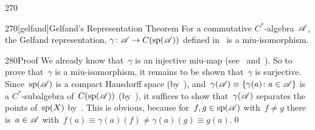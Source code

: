 \begin{parsec}{270}
\begin{point}{270}[gelfand]{Gelfand's Representation Theorem}
For a commutative $C^*$-algebra~$\mathscr{A}$,
the Gelfand representation, 
 $\gamma\colon \mathscr{A}\to C(\mathrm{sp}(\mathscr{A}))$
defined in~
is a miu-isomorphism.
\begin{point}{280}{Proof}%
We already know that~$\gamma$ is an injective miu-map
(see~ 
and~).
So to prove that~$\gamma$ is a miu-isomorphism,
it remains to be shown that~$\gamma$ is surjective.
Since~$\mathrm{sp}(\mathscr{A})$ is a compact Hausdorff space 
(by~),
and~$\gamma(\mathscr{A})\equiv \{\gamma(a)\colon a\in \mathscr{A}\}$
is a $C^*$-subalgebra of~$C(\mathrm{sp}(\mathscr{A}))$
(by~),
it suffices to show that~$\gamma(\mathscr{A})$
separates the points of~$\mathrm{sp}(X)$
by~.
This is obvious,
because
for~$f,g\in \mathrm{sp}(\mathscr{A})$ with~$f\neq g$
there is~$a\in \mathscr{A}$ with~$f(a)\equiv \gamma(a)(f)
\neq \gamma(a)(g)\equiv g(a)$.\qed
\end{point}
\end{point}
\end{parsec}
